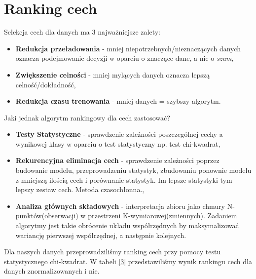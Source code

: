 \section{Ranking cech}
	Selekcja cech dla danych ma 3 najważniejsze zalety:
	
	\begin{itemize}
		\item \textbf{Redukcja przeładowania} - mniej niepotrzebnych/nieznaczących danych oznacza podejmowanie decyzji w oparciu o znaczące dane, a nie o \textit{szum},
		\item \textbf{Zwiększenie celności} - mniej mylących danych oznacza lepszą celność/dokładność,
		\item \textbf{Redukcja czasu trenowania} - mniej danych = szybszy algorytm.
	\end{itemize}
	
	\bigbreak
	Jaki jednak algorytm rankingowy dla cech zastosować?
	
	\begin{itemize}
		\item \textbf{Testy Statystyczne} - sprawdzenie zależności poszczególnej cechy a wynikowej klasy w oparciu o test statystyczny np. test chi-kwadrat,
		\item \textbf{Rekurencyjna eliminacja cech} - sprawdzenie zależności poprzez budowanie modelu, przeprowadzeniu statystyk, zbudowaniu ponownie modelu z mniejszą ilością cech i porównanie statystyk. Im lepsze statystyki tym lepszy zestaw cech. Metoda czasochłonna.,
		\item \textbf{Analiza głównych składowych} - interpretacja zbioru jako chmury N-punktów(obserwacji) w przestrzeni K-wymiarowej(zmiennych). Zadaniem algorytmy jest takie obrócenie układu współrzędnych by maksymalizować wariancję pierwszej współrzędnej, a następnie kolejnych.
	\end{itemize}
	
	\bigbreak
	Dla naszych danych przeprowadziliśmy ranking cech przy pomocy testu statystycznego chi-kwadrat. W tabeli \ref{3} przedstawiliśmy wynik rankingu cech dla danych znormalizowanych i nie.
	
